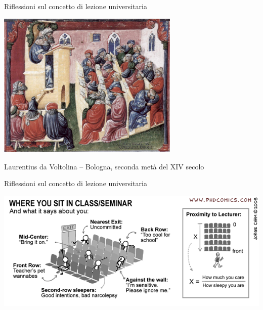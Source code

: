 \begin{frame}{Riflessioni sul concetto di lezione universitaria}
	
\begin{center}
\includegraphics[width=0.65\textwidth]{laurentius.jpg}
\end{center}
{\footnotesize
Laurentius da Voltolina -- Bologna, seconda metà del XIV secolo
}
\end{frame}

\begin{frame}{Riflessioni sul concetto di lezione universitaria}
	
\begin{center}
\includegraphics[width=1.0\textwidth]{wheresit.png}
\end{center}
\end{frame}

